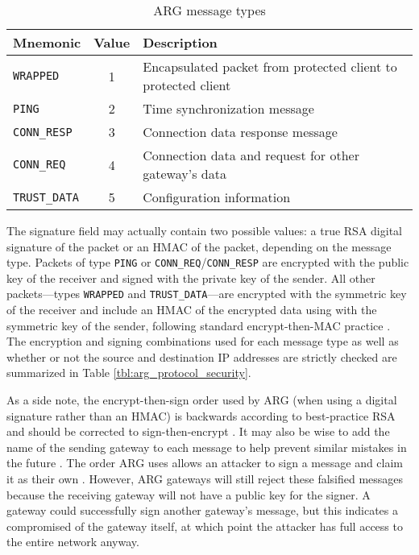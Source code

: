 \begin{table}
\caption{\ac{ARG} message types}
\label{tbl:arg_protocol_types}
\begin{tabular}{lcl}
\toprule
\textbf{Mnemonic} & \textbf{Value} & \textbf{Description}\\
\hline
\texttt{WRAPPED} & 1 & Encapsulated packet from protected client to protected client\\
\texttt{PING} & 2 & Time synchronization message\\
\texttt{CONN\_RESP} & 3 & Connection data response message\\
\texttt{CONN\_REQ} & 4 & Connection data and request for other gateway's data\\ 
\texttt{TRUST\_DATA} & 5 & Configuration information \\
\bottomrule
\end{tabular}
\end{table}

\par The signature field may actually contain two possible values: a true \ac{RSA} digital signature of the packet or an \ac{HMAC} of the packet, depending on the message type. Packets of type \texttt{PING} or \texttt{CONN\_REQ}/\texttt{CONN\_RESP} are encrypted with the public key of the receiver and signed with the private key of the sender. All other packets---types \texttt{WRAPPED} and \texttt{TRUST\_DATA}---are encrypted with the symmetric key of the receiver and include an \ac{HMAC} of the encrypted data using with the symmetric key of the sender, following standard encrypt-then-MAC practice \cite{AuthEncryptThenMAC}. The encryption and signing combinations used for each message type as well as whether or not the source and destination \ac{IP} addresses are strictly checked are summarized in Table \ref{tbl:arg_protocol_security}.

\par As a side note, the encrypt-then-sign order used by \ac{ARG} (when using a digital signature rather than an \ac{HMAC}) is backwards according to best-practice \ac{RSA} and should be corrected to sign-then-encrypt \cite{RobustPrinciplesPK}. It may also be wise to add the name of the sending gateway to each message to help prevent similar mistakes in the future \cite{EngPricCrypto}. The order \ac{ARG} uses allows an attacker to sign a message and claim it as their own \cite{rfc2633}. However, \ac{ARG} gateways will still reject these falsified messages because the receiving gateway will not have a public key for the signer. A gateway could successfully sign another gateway's message, but this indicates a compromised of the gateway itself, at which point the attacker has full access to the entire network anyway.

